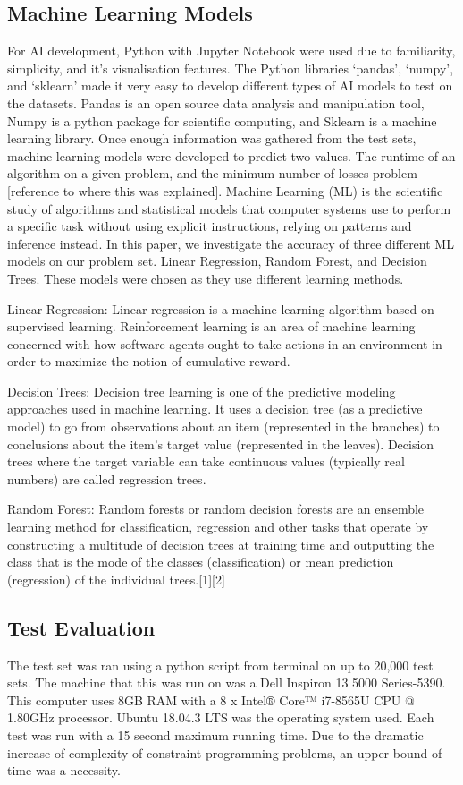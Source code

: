 \documentclass{article}
\begin{document}
	\subsection{Machine Learning Models}
	For AI development, Python with Jupyter Notebook were used due to familiarity, simplicity, and it’s visualisation features. The Python libraries ‘pandas’, ‘numpy’, and ‘sklearn’ made it very easy to develop different types of AI models to test on the datasets. Pandas is an open source data analysis and manipulation tool, Numpy is a python package for scientific computing, and Sklearn is a machine learning library.
	Once enough information was gathered from the test sets, machine learning models were developed to predict two values. The runtime of an algorithm on a given problem, and the minimum number of losses problem [reference to where this was explained]. Machine Learning (ML) is the scientific study of algorithms and statistical models that computer systems use to perform a specific task without using explicit instructions, relying on patterns and inference instead. In this paper, we investigate the accuracy of three different ML models on our problem set. Linear Regression, Random Forest, and Decision Trees. These models were chosen as they use different learning methods.
	
	Linear Regression: Linear regression is a machine learning algorithm based on supervised learning. Reinforcement learning is an area of machine learning concerned with how software agents ought to take actions in an environment in order to maximize the notion of cumulative reward.
	
	Decision Trees: Decision tree learning is one of the predictive modeling approaches used in  machine learning. It uses a decision tree (as a predictive model) to go from observations about an item (represented in the branches) to conclusions about the item's target value (represented in the leaves). Decision trees where the target variable can take continuous values (typically real numbers) are called regression trees.
	
	Random Forest: Random forests or random decision forests are an ensemble learning method for classification, regression and other tasks that operate by constructing a multitude of decision trees at training time and outputting the class that is the mode of the classes (classification) or mean prediction (regression) of the individual trees.[1][2]
	
	\subsection{Test Evaluation}
	The test set was ran using a python script from terminal on up to 20,000 test sets. The machine that this was run on was a Dell Inspiron 13 5000 Series-5390. This computer uses 8GB RAM with a 8 x Intel® Core™ i7-8565U CPU @ 1.80GHz processor. Ubuntu 18.04.3 LTS was the operating system used. Each test was run with a 15 second maximum running time. Due to the dramatic increase of complexity of constraint programming problems, an upper bound of time was a necessity. 
	
\end{document}
